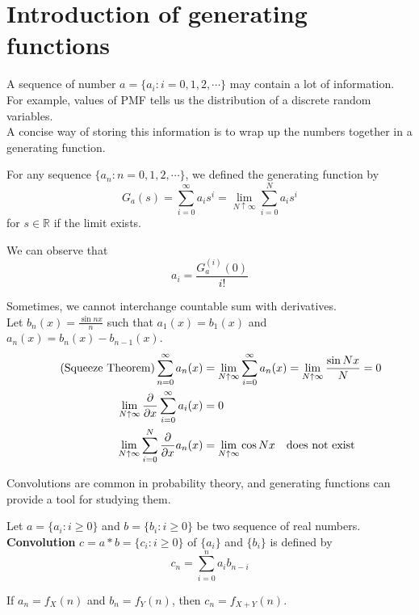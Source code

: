 \documentclass{huhtakm-template-book}
\begin{document}
\section{Introduction of generating functions}
A sequence of number $a=\{a_{i}:i=0,1,2,\cdots\}$ may contain a lot of information. For example, values of PMF tells us the distribution of a discrete random variables.\\
A concise way of storing this information is to wrap up the numbers together in a generating function. 
\begin{defn}
	For any sequence $\{a_{n}:n=0,1,2,\cdots\}$, we defined the generating function by
	\begin{equation*}
		G_{a}(s)=\sum_{i=0}^{\infty}a_{i}s^{i}=\lim_{N\uparrow\infty}\sum_{i=0}^{N}a_{i}s^{i}
	\end{equation*}
	for $s\in\mathbb{R}$ if the limit exists. 
\end{defn}
\begin{rem}
	We can observe that
	\begin{equation*}
		a_{i}=\frac{G_{a}^{(i)}(0)}{i!}
	\end{equation*}
\end{rem}
\begin{eg}
	Sometimes, we cannot interchange countable sum with derivatives.\\
	Let $b_{n}(x)=\frac{\sin{nx}}{n}$ such that $a_{1}(x)=b_{1}(x)$ and $a_{n}(x)=b_{n}(x)-b_{n-1}(x)$.
	\begin{align*}
		\tag{Squeeze Theorem}
		\sum_{n=0}^{\infty}a_{n}(x)&=\lim_{N\uparrow\infty}\sum_{i=0}^{\infty}a_{n}(x)=\lim_{N\uparrow\infty}\frac{\sin{Nx}}{N}=0\\
		\lim_{N\uparrow\infty}\pdv*{\sum_{i=0}^{\infty}a_{i}(x)}{x}&=0\\
		\lim_{N\uparrow\infty}\sum_{i=0}^{N}\pdv*{a_{n}(x)}{x}&=\lim_{N\uparrow\infty}\cos{Nx}\quad \text{does not exist}
	\end{align*}
\end{eg}
Convolutions are common in probability theory, and generating functions can provide a tool for studying them.
\begin{defn}
	Let $a=\{a_{i}:i\geq 0\}$ and $b=\{b_{i}:i\geq 0\}$ be two sequence of real numbers. \textbf{Convolution} $c=a*b=\{c_{i}:i\geq 0\}$ of $\{a_{i}\}$ and $\{b_{i}\}$ is defined by
	\begin{equation*}
		c_{n}=\sum_{i=0}^{n}a_{i}b_{n-i}
	\end{equation*}
\end{defn}
\begin{eg}
	If $a_{n}=f_{X}(n)$ and $b_{n}=f_{Y}(n)$, then $c_{n}=f_{X+Y}(n)$.
\end{eg}
\end{document}
